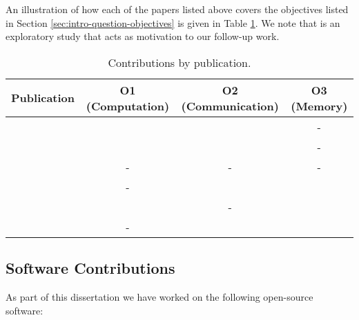 An illustration of how each of the papers listed above covers the
objectives listed in Section \ref{sec:intro-question-objectives} is given
in Table \ref{tab:papers-objectives}. We note that \sessionlength is an exploratory study that acts as motivation to our follow-up work.

\begin{table}
	\centering
	\begin{tabular}{l c c c}
		\toprule
		Publication & O1 (Computation) & O2 (Communication) & O3 (Memory) \\
		\midrule
		\conceptsicdm & \checkmark  & \checkmark  & - \\

		\conceptskais &  \checkmark  & \checkmark  & - \\

		\sessionlength & - & - & - \\

		\boostvht & - & \checkmark & \checkmark \\

		\uncertaintrees & \checkmark & - & \checkmark \\

		\blockgbt & - & \checkmark & \checkmark \\
		\bottomrule
	\end{tabular}
	\caption{Contributions by publication.}
	\label{tab:papers-objectives}
\end{table}

\subsection{Software Contributions}

As part of this dissertation we have worked on the following open-source software:

